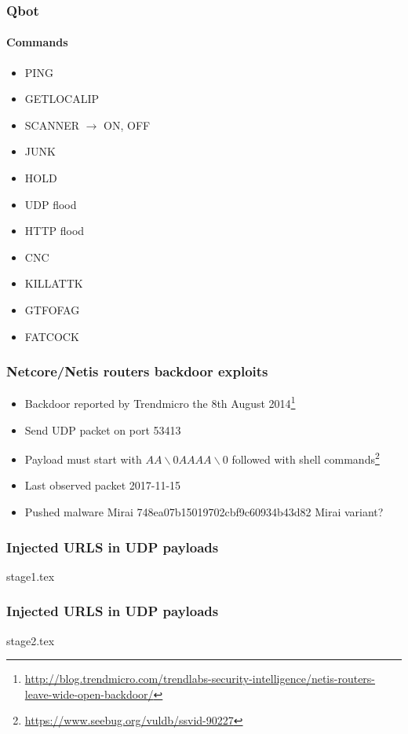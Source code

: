 \documentclass{beamer}
\begin{document}
\begin{frame}
\frametitle{Qbot}
\framesubtitle{Commands}
\begin{itemize}
    \item PING
    \item GETLOCALIP
    \item SCANNER $\to$ ON, OFF
    \item JUNK
    \item HOLD
    \item UDP flood
    \item HTTP flood
    \item CNC
    \item KILLATTK
    \item GTFOFAG
    \item FATCOCK
\end{itemize}
\end{frame}



\begin{frame}
    \frametitle{Netcore/Netis routers backdoor exploits}
    \begin{itemize}
        \item Backdoor reported by Trendmicro the 8th August 2014\footnote{\url{http://blog.trendmicro.com/trendlabs-security-intelligence/netis-routers-leave-wide-open-backdoor/}}
        \item Send UDP packet on port 53413
        \item Payload must start with $AA \backslash 0 AAAA\backslash 0$ followed with shell commands\footnote{\url{https://www.seebug.org/vuldb/ssvid-90227}}
        \item Last observed packet 2017-11-15
        \item Pushed malware Mirai 748ea07b15019702cbf9c60934b43d82 Mirai variant?
    \end{itemize}
\end{frame}

\begin{frame}[fragile]
\frametitle{Injected URLS in UDP payloads}
 {stage1.tex}
\end{frame}


\begin{frame}[fragile]
\frametitle{Injected URLS in UDP payloads}
 {stage2.tex}
\end{frame}
\end{document}
